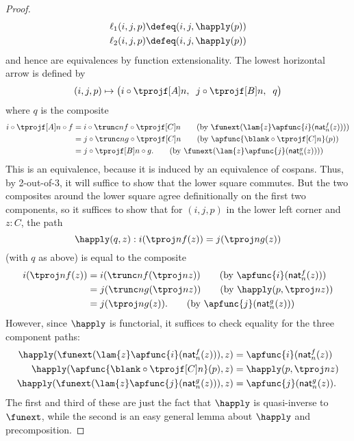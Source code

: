 \begin{proof}
  \begin{align*}
    \ell_1(i,j,p) &\defeq (i,j,\happly(p))\\
    \ell_2(i,j,p) &\defeq (i,j,\happly(p))
  \end{align*}
  and hence are equivalences by function extensionality.
  The lowest horizontal arrow is defined by
  \[ (i,j,p) \mapsto \big( i\circ \tprojf[A]n,\;\; j \circ \tprojf[B] n,\;\; q\big) \]
  where $q$ is the composite
  \begin{align}
    i\circ \tprojf[A]n \circ f
    &= i\circ \trunc nf \circ \tprojf[C]n
    \tag{by $\funext(\lam{z} \apfunc{i}(\mathsf{nat}^f_n(z)))$}\\
    &= j\circ \trunc ng \circ \tprojf[C]n
    \tag{by $\apfunc{\blank\circ \tprojf[C] n}(p)$}\\
    &= j\circ \tprojf[B]n \circ g.
    \tag{by $\funext(\lam{z} \apfunc{j}(\mathsf{nat}^g_n(z)))$}
  \end{align}
  This is an equivalence, because it is induced by an equivalence of cospans.
  Thus, by 2-out-of-3, it will suffice to show that the lower square commutes.
  But the two composites around the lower square agree definitionally on the first two components, so it suffices to show that for $(i,j,p)$ in the lower left corner and $z:C$, the path
  \[ \happly(q,z) : i(\tproj n{f(z)}) = j(\tproj n{g(z)}) \]
  (with $q$ as above)
  is equal to the composite
  \begin{align}
    i(\tproj n{f(z)})
    &= i(\trunc nf(\tproj nz))
    \tag{by $\apfunc{i}(\mathsf{nat}^f_n(z))$}\\
    &= j(\trunc ng(\tproj nz))
    \tag{by $\happly(p,\tproj nz)$}\\
    &= j(\tproj n{g(z)}).
    \tag{by $\apfunc{j}(\mathsf{nat}^g_n(z))$}
  \end{align}
  However, since $\happly$ is functorial, it suffices to check equality for the three component paths:
  \begin{align*}
    \happly({\funext(\lam{z} \apfunc{i}(\mathsf{nat}^f_n(z)))},z)
    &= {\apfunc{i}(\mathsf{nat}^f_n(z))}\\
    \happly(\apfunc{\blank\circ \tprojf[C] n}(p), z)
    &= {\happly(p,\tproj nz)}\\
    \happly({\funext(\lam{z} \apfunc{j}(\mathsf{nat}^g_n(z)))},z)
    &= {\apfunc{j}(\mathsf{nat}^g_n(z))}.
  \end{align*}
  The first and third of these are just the fact that $\happly$ is quasi-inverse to $\funext$, while
  the second is an easy general lemma about $\happly$ and precomposition.
\end{proof}


